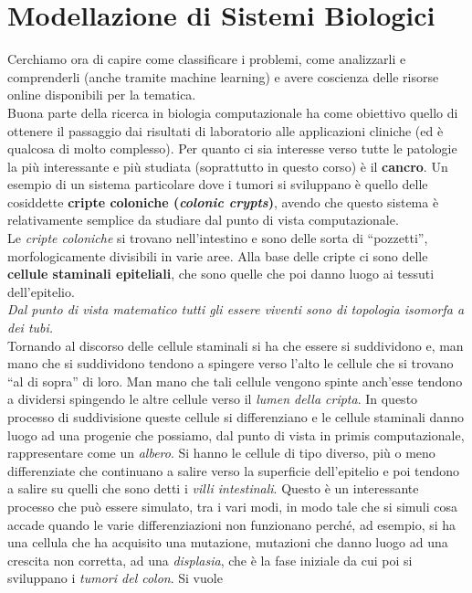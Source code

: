 \documentclass[a4paper,12pt, oneside]{book}
\begin{document}
\chapter{Modellazione di Sistemi Biologici}
Cerchiamo ora di capire come classificare i problemi, come analizzarli e
comprenderli (anche tramite machine learning) e avere coscienza delle risorse
online disponibili per la tematica.\\
Buona parte della ricerca in biologia computazionale ha come obiettivo quello di
ottenere il passaggio dai risultati di laboratorio alle applicazioni cliniche
(ed è qualcosa di molto complesso). Per quanto ci sia interesse verso tutte le
patologie la più interessante e più studiata (soprattutto in questo corso) è il
\textbf{cancro}. Un esempio di un sistema particolare dove i tumori si
sviluppano è quello delle cosiddette \textbf{cripte coloniche (\textit{colonic
    crypts})}, avendo che questo sistema è relativamente semplice da studiare
dal punto di vista computazionale.\\
Le \textit{cripte coloniche} si trovano nell'intestino e sono delle sorta di
``pozzetti'', morfologicamente divisibili in varie aree.
Alla base delle cripte ci sono delle \textbf{cellule staminali epiteliali}, che
sono quelle che poi danno luogo ai tessuti dell'epitelio.\\
\textit{Dal punto di vista matematico tutti gli essere viventi sono di topologia
isomorfa a dei tubi.}\\
Tornando al discorso delle cellule staminali si ha che essere si suddividono e,
man mano che si suddividono tendono a spingere verso l'alto le cellule che si
trovano ``al di sopra'' di loro. Man mano che tali cellule vengono spinte
anch'esse tendono a dividersi spingendo le altre cellule verso il \textit{lumen
  della cripta}. In questo processo di suddivisione queste cellule si
differenziano e le cellule staminali danno luogo ad una progenie che possiamo,
dal punto di vista in primis computazionale, rappresentare come un
\textit{albero}. Si hanno le cellule di tipo diverso, più o meno
differenziate che continuano a salire verso la superficie dell'epitelio e poi
tendono a salire su quelli che sono detti i \textit{villi intestinali}. Questo è
un interessante processo che può essere simulato, tra i vari modi, in modo tale
che si simuli cosa accade quando le varie differenziazioni non funzionano
perché, ad esempio, si ha una cellula che ha acquisito una mutazione, mutazioni
che danno luogo ad una crescita non corretta, ad una \textit{displasia}, che è
la fase iniziale da cui poi si sviluppano i \textit{tumori del colon}. Si vuole
\end{document}
